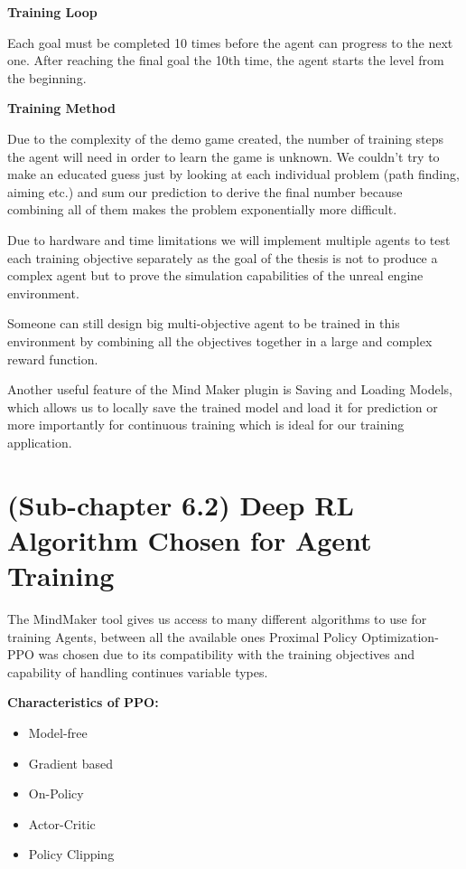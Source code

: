 \documentclass[a4paper,one side,12pt]{book}
\begin{document}
\textbf{Training Loop}

Each goal must be completed 10 times before the agent can progress to
the next one. After reaching the final goal the 10th time, the agent
starts the level from the beginning.

\textbf{Training Method}

Due to the complexity of the demo game created, the number of training
steps the agent will need in order to learn the game is unknown. We
couldn't try to make an educated guess just by looking at each
individual problem (path finding, aiming etc.) and sum our prediction to
derive the final number because combining all of them makes the problem
exponentially more difficult.

Due to hardware and time limitations we will implement multiple agents to test each training
objective separately as the goal of the thesis is not to produce a complex agent but to prove the 
simulation capabilities of the unreal engine environment. 

Someone can still design big multi-objective agent to be trained in this environment by combining all the objectives together in a large and complex reward function.

Another useful feature of  the Mind Maker plugin is Saving and Loading Models, which allows us to locally save the trained model and load it for
prediction or more importantly for continuous training which is ideal
for our training application.

\section{(Sub-chapter 6.2) Deep RL Algorithm Chosen for Agent Training}

The MindMaker tool gives us access to many different algorithms to use for training 
Agents, between all the available ones Proximal Policy Optimization-PPO was chosen due to 
its compatibility with the training objectives and capability of handling continues variable types.


\textbf{Characteristics of PPO:}

\begin{itemize}
\item
  Model-free
\item
  Gradient based
\item 
  On-Policy
\item
  Actor-Critic
\item
  Policy Clipping
\end{itemize}
\end{document}
